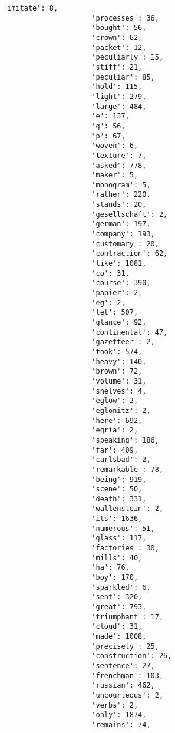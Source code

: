 \documentclass[11pt]{article}
\begin{document}
\begin{Verbatim}[commandchars=\\\{\}]
                     'imitate': 8,
                     'processes': 36,
                     'bought': 56,
                     'crown': 62,
                     'packet': 12,
                     'peculiarly': 15,
                     'stiff': 21,
                     'peculiar': 85,
                     'hold': 115,
                     'light': 279,
                     'large': 484,
                     'e': 137,
                     'g': 56,
                     'p': 67,
                     'woven': 6,
                     'texture': 7,
                     'asked': 778,
                     'maker': 5,
                     'monogram': 5,
                     'rather': 220,
                     'stands': 20,
                     'gesellschaft': 2,
                     'german': 197,
                     'company': 193,
                     'customary': 20,
                     'contraction': 62,
                     'like': 1081,
                     'co': 31,
                     'course': 390,
                     'papier': 2,
                     'eg': 2,
                     'let': 507,
                     'glance': 92,
                     'continental': 47,
                     'gazetteer': 2,
                     'took': 574,
                     'heavy': 140,
                     'brown': 72,
                     'volume': 31,
                     'shelves': 4,
                     'eglow': 2,
                     'eglonitz': 2,
                     'here': 692,
                     'egria': 2,
                     'speaking': 186,
                     'far': 409,
                     'carlsbad': 2,
                     'remarkable': 78,
                     'being': 919,
                     'scene': 50,
                     'death': 331,
                     'wallenstein': 2,
                     'its': 1636,
                     'numerous': 51,
                     'glass': 117,
                     'factories': 30,
                     'mills': 40,
                     'ha': 76,
                     'boy': 170,
                     'sparkled': 6,
                     'sent': 320,
                     'great': 793,
                     'triumphant': 17,
                     'cloud': 31,
                     'made': 1008,
                     'precisely': 25,
                     'construction': 26,
                     'sentence': 27,
                     'frenchman': 103,
                     'russian': 462,
                     'uncourteous': 2,
                     'verbs': 2,
                     'only': 1874,
                     'remains': 74,

\end{Verbatim}
\end{document}
